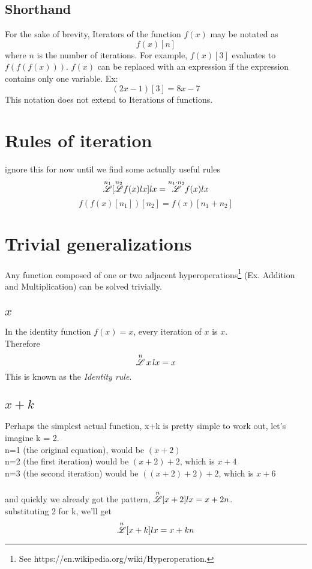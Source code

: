 \documentclass[12pt, letterpaper]{article}
\begin{document}
\subsection{Shorthand}
For the sake of brevity, Iterators of the function $f(x)$ may be notated as
$$f(x)[n]$$ 
where $n$ is the number of iterations. For example, $f(x)[3]$ evaluates to $f(f(f(x)))$. $f(x)$ can be replaced with an expression if the expression contains only one variable. Ex:
$$(2x-1)[3] = 8x-7$$
This notation does not extend to Iterations of functions.

\section{Rules of iteration}
ignore this for now until we find some actually useful rules
$$\overset{n_1}{\mathscr{L}}[\overset{n_2}{\mathscr{L}} f(x) lx] lx = \overset{n_1\cdot n_2}{\mathscr{L}} f(x) lx$$
$$f(f(x)[n_1])[n_2] = f(x)[n_1+n_2]$$

\section{Trivial generalizations}
Any function composed of one or two adjacent hyperoperations\footnote{See https://en.wikipedia.org/wiki/Hyperoperation.} (Ex. Addition and Multiplication) can be solved trivially.

\subsection{$x$}
In the identity function \(f(x) = x\), every iteration of \(x\) is \(x\). 
\\
Therefore
$$\overset{n}{\mathscr{L}} \, x \, lx = x$$
This is known as the \textit{Identity rule}.

\subsection{$x+k$}
Perhaps the simplest actual function, x+k is pretty simple to work out, let's imagine k = 2.
\\
n=1 (the original equation), would be {$(x+2)$}
\\
n=2 (the first iteration) would be {$(x+2)+2$}, which is {$x+4$}
\\
n=3 (the second iteration) would be {$((x+2)+2)+2$}, which is {$x+6$}
\\
\\
and quickly we already got the pattern, $\overset{n}{\mathscr{L}} [x+2] lx = x+2n$.
\\
substituting 2 for k, we'll get
$$\overset{n}{\mathscr{L}} [x+k] lx = x+kn$$
\end{document}

